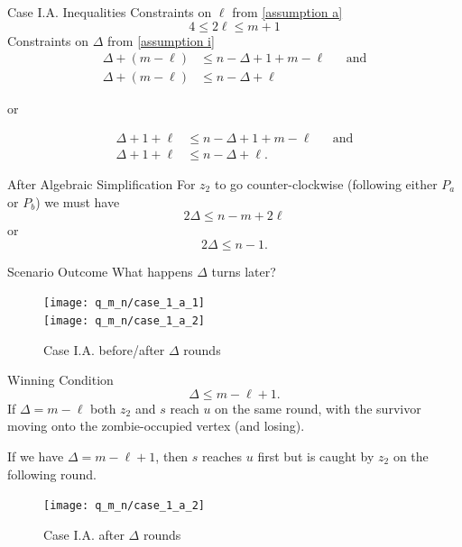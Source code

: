 \begin{frame}{Case I.A. Inequalities}
Constraints on $\ell$ from \ref{assumption a}
\[ 4 \leq 2 \ell \leq m + 1 \]
Constraints on $\Delta$ from \ref{assumption i}
\begin{align*}
 \Delta + (m - \ell) &\leq n - \Delta + 1 + m - \ell && \text{and} \\
 \Delta + (m - \ell) &\leq n - \Delta + \ell
\end{align*}
\begin{center}or\end{center}
\begin{align*}
 \Delta + 1 + \ell &\leq n - \Delta + 1 + m - \ell && \text{and} \\
 \Delta + 1 + \ell &\leq n - \Delta + \ell .
\end{align*}
\end{frame}

\begin{frame}{After Algebraic Simplification}
For $z_2$ to go counter-clockwise (following either $P_a$ or $P_b$) we must have
\centering
\[ 2 \Delta \leq n - m + 2\ell \]
or
\[ 2 \Delta \leq n - 1 .\]
\end{frame}

\begin{frame}{Scenario Outcome}
What happens $\Delta$ turns later?
\begin{figure}
\texttt{[image: q\_m\_n/case\_1\_a\_1]} \\
\texttt{[image: q\_m\_n/case\_1\_a\_2]}
\caption{Case I.A. before/after $\Delta$ rounds}
\end{figure}
\end{frame}

\begin{frame}{Winning Condition}
\[ \Delta \leq m- \ell + 1 .\]
If $\Delta = m - \ell$ both $z_2$ and $s$ reach $u$ on the same round,
with the survivor moving onto the zombie-occupied vertex (and losing).

If we have $\Delta = m - \ell + 1$, then $s$ reaches $u$ first
but is caught by $z_2$ on the following round.

\begin{figure}
\texttt{[image: q\_m\_n/case\_1\_a\_2]}
\caption{Case I.A. after $\Delta$ rounds}
\end{figure}
\end{frame}

